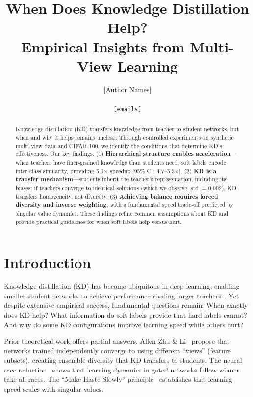 \documentclass{article}
\title{When Does Knowledge Distillation Help?\\Empirical Insights from Multi-View Learning}
\author{
[Author Names] \\
[Affiliations] \\
\texttt{[emails]}
}
\begin{document}
\maketitle

\begin{abstract}
Knowledge distillation (KD) transfers knowledge from teacher to student networks, but when and why it helps remains unclear. Through controlled experiments on synthetic multi-view data and CIFAR-100, we identify the conditions that determine KD's effectiveness. Our key findings: (1) \textbf{Hierarchical structure enables acceleration}---when teachers have finer-grained knowledge than students need, soft labels encode inter-class similarity, providing 5.0$\times$ speedup [95\% CI: 4.7--5.3$\times$]. (2) \textbf{KD is a transfer mechanism}---students inherit the teacher's representation, including its biases; if teachers converge to identical solutions (which we observe: std $= 0.002$), KD transfers homogeneity, not diversity. (3) \textbf{Achieving balance requires forced diversity and inverse weighting}, with a fundamental speed trade-off predicted by singular value dynamics. These findings refine common assumptions about KD and provide practical guidelines for when soft labels help versus hurt.
\end{abstract}

\section{Introduction}

Knowledge distillation (KD) has become ubiquitous in deep learning, enabling smaller student networks to achieve performance rivaling larger teachers~\cite{hinton2015distilling}. Yet despite extensive empirical success, fundamental questions remain: When exactly does KD help? What information do soft labels provide that hard labels cannot? And why do some KD configurations improve learning speed while others hurt?

Prior theoretical work offers partial answers. Allen-Zhu \& Li~\cite{allen2023towards} propose that networks trained independently converge to using different ``views'' (feature subsets), creating ensemble diversity that KD transfers to students. The neural race reduction~\cite{saxe2022neural} shows that learning dynamics in gated networks follow winner-take-all races. The ``Make Haste Slowly'' principle~\cite{jarvis2025makehaste} establishes that learning speed scales with singular values.
\end{document}
